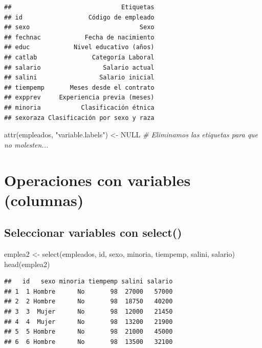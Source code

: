 \documentclass[
]{book}
\newenvironment{Shaded}{\begin{snugshade}}{\end{snugshade}}
\newcommand{\CommentTok}[1]{\textcolor[rgb]{0.56,0.35,0.01}{\textit{#1}}}
\newcommand{\ConstantTok}[1]{\textcolor[rgb]{0.00,0.00,0.00}{#1}}
\newcommand{\FunctionTok}[1]{\textcolor[rgb]{0.00,0.00,0.00}{#1}}
\newcommand{\NormalTok}[1]{#1}
\newcommand{\OtherTok}[1]{\textcolor[rgb]{0.56,0.35,0.01}{#1}}
\newcommand{\StringTok}[1]{\textcolor[rgb]{0.31,0.60,0.02}{#1}}
\theoremstyle{break}
\begin{document}
\begin{verbatim}
##                              Etiquetas
## id                  Código de empleado
## sexo                              Sexo
## fechnac            Fecha de nacimiento
## educ            Nivel educativo (años)
## catlab               Categoría Laboral
## salario                 Salario actual
## salini                 Salario inicial
## tiempemp       Meses desde el contrato
## expprev     Experiencia previa (meses)
## minoria           Clasificación étnica
## sexoraza Clasificación por sexo y raza
\end{verbatim}

\begin{Shaded}
\begin{Highlighting}[]
\FunctionTok{attr}\NormalTok{(empleados, }\StringTok{"variable.labels"}\NormalTok{) }\OtherTok{\textless{}{-}} \ConstantTok{NULL}                  \CommentTok{\# Eliminamos las etiquetas para que no molesten...}
\end{Highlighting}
\end{Shaded}

\hypertarget{operaciones-con-variables-columnas}{%
\section{Operaciones con variables (columnas)}\label{operaciones-con-variables-columnas}}

\hypertarget{seleccionar-variables-con-select}{%
\subsection{\texorpdfstring{Seleccionar variables con \textbf{select()}}{Seleccionar variables con select()}}\label{seleccionar-variables-con-select}}

\begin{Shaded}
\begin{Highlighting}[]
\NormalTok{emplea2 }\OtherTok{\textless{}{-}} \FunctionTok{select}\NormalTok{(empleados, id, sexo, minoria, tiempemp, salini, salario)}
\FunctionTok{head}\NormalTok{(emplea2)}
\end{Highlighting}
\end{Shaded}

\begin{verbatim}
##   id   sexo minoria tiempemp salini salario
## 1  1 Hombre      No       98  27000   57000
## 2  2 Hombre      No       98  18750   40200
## 3  3  Mujer      No       98  12000   21450
## 4  4  Mujer      No       98  13200   21900
## 5  5 Hombre      No       98  21000   45000
## 6  6 Hombre      No       98  13500   32100
\end{verbatim}
\end{document}
